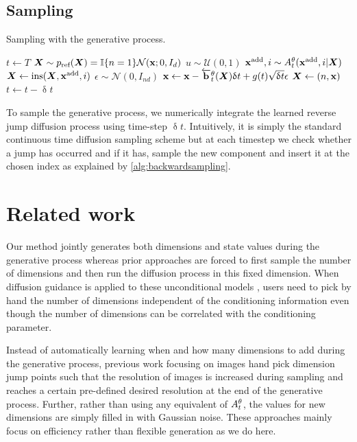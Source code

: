\subsection{Sampling}

\begin{algorithm}[t]
\caption{Sampling with the generative process.}
\begin{algorithmic}[1] %
\State $t \leftarrow T$
\State ${\bm{X}} \sim p_{\textup{ref}}({\bm{X}}) = \mathbb{I}\{ n=1\} \mathcal{N}({\mathbf{x}}; 0, I_{d})$
    \State $u \sim \mathcal{U}(0, 1)$
        \State ${\mathbf{x}}^{\textup{add}}, i \sim A_{t}^\theta({\mathbf{x}}^{\textup{add}}, i | {\bm{X}})$
        \State ${\bm{X}} \leftarrow \text{ins}({\bm{X}}, {\mathbf{x}}^{\textup{add}}, i)$
    \EndIf
    \State $\epsilon \sim \mathcal{N}(0, I_{nd})$
    \State ${\mathbf{x}} \leftarrow {\mathbf{x}} - \overleftarrow{\mathbf{b}}_{t}^\theta({\bm{X}}) \updelta t + g(t) \sqrt{\updelta t} \epsilon$
    \State ${\bm{X}} \leftarrow (n, {\mathbf{x}})$
    \State $t \leftarrow t - \updelta t$
\EndWhile
\end{algorithmic}
\label{alg:backwardsampling}
\end{algorithm}

To sample the generative process, we numerically integrate the learned reverse jump diffusion process using time-step  $\updelta t$. Intuitively, it is simply the standard continuous time diffusion sampling scheme \cite{song2020score} but at each timestep we check whether a jump has occurred and if it has, sample the new component and insert it at the chosen index as explained by \cref{alg:backwardsampling}.


\section{Related work}

Our method jointly generates both dimensions and state values during the generative process whereas prior approaches \cite{hoogeboom2022equivariant, igashov2022equivariant} are forced to first sample the number of dimensions and then run the diffusion process in this fixed dimension. When diffusion guidance is applied to these unconditional models \cite{weiss2023guided, zhang2023towards}, users need to pick by hand the number of dimensions independent of the conditioning information even though the number of dimensions can be correlated with the conditioning parameter.

Instead of automatically learning when and how many dimensions to add during the generative process, previous work focusing on images \cite{jing2022subspace, zhang2022dimensionality} hand pick dimension jump points such that the resolution of images is increased during sampling and reaches a certain pre-defined desired resolution at the end of the generative process. Further, rather than using any equivalent of $A_t^\theta$, the values for new dimensions are simply filled in with Gaussian noise. These approaches mainly focus on efficiency rather than flexible generation as we do here.


